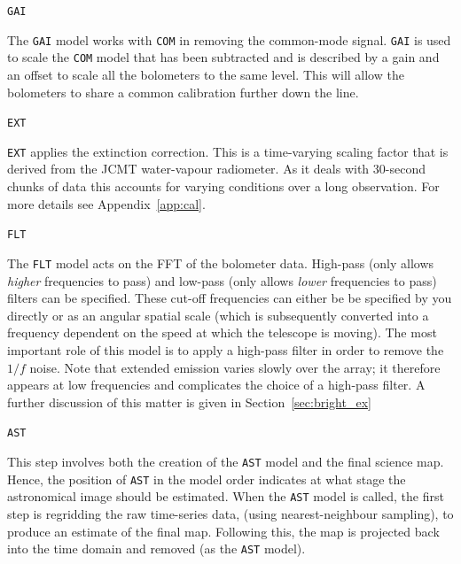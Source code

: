 \documentclass[twoside,11pt]{article}
\newcommand{\htmlref}[2]{#1}
\newcommand{\latexhtml}[2]{#1}
\renewcommand{\_}{\texttt{\symbol{95}}}
\newcommand{\cref}[3]{\latexhtml{#1~\ref{#2}}{\htmlref{#3}{#2}}}
\begin{document}
\begin{minipage}[t]{0.07\linewidth}
\texttt{GAI}
\end{minipage}
\begin{minipage}[t]{0.92\linewidth}The \texttt{GAI} model works with
\texttt{COM} in removing the common-mode signal. \texttt{GAI} is used to
scale the \texttt{COM} model that has been subtracted and is described by
a gain and an offset to scale all the bolometers to the same level. This
will allow the bolometers to share a common calibration further down the
line. \\
\end{minipage}
\begin{minipage}[t]{0.07\linewidth}
\texttt{EXT}
\end{minipage}
\begin{minipage}[t]{0.92\linewidth}\texttt{EXT} applies the extinction
correction. This is a time-varying scaling factor that is derived from
the JCMT water-vapour radiometer. As it deals with 30-second chunks of
data this accounts for varying conditions over a long observation. For
more details see \cref{Appendix}{app:cal}{SCUBA-2 data calibration}. \\
\end{minipage}
\begin{minipage}[t]{0.07\linewidth}
\texttt{FLT}
\end{minipage}
\begin{minipage}[t]{0.92\linewidth}The \texttt{FLT} model acts on the FFT
of the bolometer data. High-pass (only allows \emph{higher} frequencies to
pass) and low-pass (only allows \emph{lower} frequencies to pass) filters
can be specified. These cut-off frequencies can either be be specified by
you directly or as an angular spatial scale (which is subsequently
converted into a frequency dependent on the speed at which the
telescope is moving). The most important role of this model is to
apply a high-pass filter in order to remove the $1/f$ noise. Note that
extended emission varies slowly over the array; it therefore appears
at low frequencies and complicates the choice of a high-pass filter. A
further discussion of this matter is given in
\cref{Section}{sec:bright_ex}{Extended galactic sources}\\
\end{minipage}
\begin{minipage}[t]{0.07\linewidth}
\texttt{AST}
\end{minipage}
\begin{minipage}[t]{0.92\linewidth}This step involves both the creation of the
\texttt{AST} model and the final science map. Hence, the position of
\texttt{AST} in the model order indicates at what stage the astronomical
image should be estimated. When the \texttt{AST} model is called, the first
step is regridding the raw time-series data, (using nearest-neighbour sampling),
to produce an estimate of the final map. Following this, the map is
projected back into the time domain and removed (as the \texttt{AST}
model).\\
\end{minipage}
\end{document}

